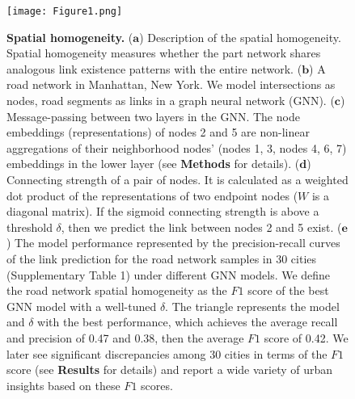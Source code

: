 \documentclass[10pt]{wlscirep}
\begin{document}
\begin{figure}[H]
\centering
\begin{minipage}{1.00\textwidth}
    \centering
  \texttt{[image: Figure1.png]}
  \label{fig:1}
\end{minipage}
\caption{\footnotesize
\textbf{Spatial homogeneity.} 
($\textbf{a}$) Description of the spatial homogeneity. Spatial homogeneity measures whether the part network shares analogous link existence patterns with the entire network.  ($\textbf{b}$) A road network in Manhattan, New York. We model intersections as nodes, road segments as links in a graph neural network (GNN). ($\textbf{c}$) Message-passing between two layers in the GNN. The node embeddings (representations) of nodes 2 and 5 are non-linear aggregations of their neighborhood nodes’ (nodes 1, 3, nodes 4, 6, 7) embeddings in the lower layer (see \textbf{Methods} for details). ($\textbf{d}$) Connecting strength of a pair of nodes. It is calculated as a weighted dot product of the representations of two endpoint nodes ($W$ is a diagonal matrix). If the sigmoid connecting strength is above a threshold $\delta$, then we predict the link between nodes 2 and 5 exist. ($\textbf{e}$) The model performance represented by the precision-recall curves of the link prediction for the road network samples in 30 cities (Supplementary Table 1) under different GNN models. We define the road network spatial homogeneity as the $F1$ score of the best GNN model with a well-tuned $\delta$. The triangle represents the model and $\delta$ with the best performance, which achieves the average recall and precision of 0.47 and 0.38, then the average $F1$ score of 0.42. We later see significant discrepancies among 30 cities in terms of the $F1$ score (see \textbf{Results} for details) and report a wide variety of urban insights based on these $F1$ scores.}
\label{fig:1}
\end{figure}
\end{document}
